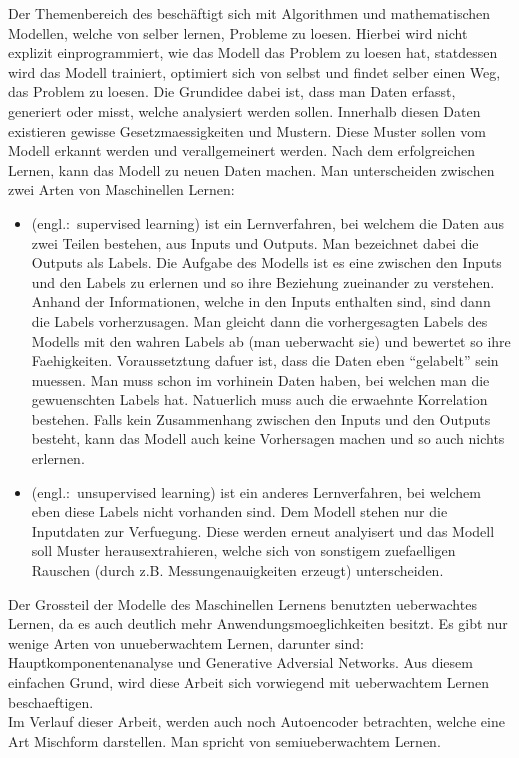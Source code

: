 \documentclass[../main]{subfiles}
\begin{document}
Der Themenbereich des  beschäftigt sich mit Algorithmen und mathematischen Modellen, welche von selber lernen, Probleme zu loesen.
Hierbei wird nicht explizit einprogrammiert, wie das Modell das Problem zu loesen
hat, statdessen wird das Modell trainiert, optimiert sich von selbst und findet selber
einen Weg, das Problem zu loesen.
Die Grundidee dabei ist, dass man Daten erfasst, generiert oder misst, welche
analysiert werden sollen. Innerhalb diesen Daten existieren gewisse
Gesetzmaessigkeiten und Mustern. Diese Muster sollen vom Modell
erkannt werden und verallgemeinert werden. Nach dem erfolgreichen Lernen,
kann das Modell  zu neuen Daten machen.
\para{}
Man unterscheiden zwischen zwei Arten von Maschinellen Lernen:
\begin{itemize}
\item{
     (engl.:\ supervised learning) ist ein
    Lernverfahren, bei welchem die Daten aus zwei Teilen bestehen, aus Inputs und
    Outputs. Man bezeichnet dabei die Outputs als Labels. Die Aufgabe des Modells
    ist es eine  zwischen den Inputs und den Labels zu
    erlernen und so ihre Beziehung zueinander zu verstehen.
    Anhand der Informationen, welche in den Inputs enthalten
    sind, sind dann die Labels vorherzusagen. Man gleicht dann die
    vorhergesagten Labels des Modells mit den wahren Labels ab (man ueberwacht sie) und bewertet so ihre Faehigkeiten.
    \para{}
    Voraussetztung dafuer ist, dass die Daten eben ``gelabelt'' sein muessen.
    Man muss schon im vorhinein Daten haben, bei welchen man die gewuenschten
    Labels hat. Natuerlich muss auch die erwaehnte Korrelation bestehen. Falls
    kein Zusammenhang zwischen den Inputs und den Outputs besteht, kann das
    Modell auch keine Vorhersagen machen und so auch nichts erlernen.
  }
\item{
     (engl.:\ unsupervised learning) ist ein anderes
    Lernverfahren, bei welchem eben diese Labels nicht vorhanden sind. Dem
    Modell stehen nur die Inputdaten zur Verfuegung. Diese werden erneut analyisert
    und das Modell soll Muster herausextrahieren, welche sich von sonstigem
    zuefaelligen Rauschen (durch z.B. Messungenauigkeiten erzeugt)
    unterscheiden.
  }
\end{itemize}

Der Grossteil der Modelle des Maschinellen Lernens benutzten ueberwachtes
Lernen, da es auch deutlich mehr Anwendungsmoeglichkeiten besitzt. Es gibt nur wenige Arten von
unueberwachtem Lernen, darunter sind: Hauptkomponentenanalyse und Generative
Adversial Networks. Aus diesem einfachen Grund, wird diese Arbeit sich
vorwiegend mit ueberwachtem Lernen beschaeftigen. \\
Im Verlauf dieser Arbeit, werden auch noch Autoencoder betrachten, welche eine
Art Mischform darstellen. Man spricht von semiueberwachtem Lernen.
\para{}
\end{document}
